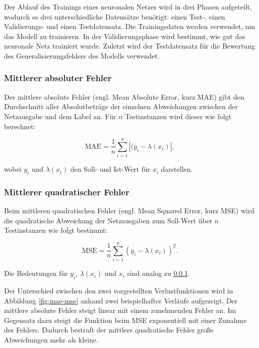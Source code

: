 \mypar Der Ablauf des Trainings eines neuronalen Netzes wird in drei Phasen aufgeteilt, wodurch es drei unterschiedliche Datensätze benötigt: einen Test-, einen Validierungs- und einen Testdatensatz. Die Trainingsdaten werden verwendet, um das Modell zu trainieren. In der Validierungsphase wird bestimmt, wie gut das neuronale Netz trainiert wurde. Zuletzt wird der Testdatensatz für die Bewertung des Generalisierungsfehlers des Modells verwendet. \cite{hastie2009elements}


\subsubsection{Mittlerer absoluter Fehler}\label{mae-section}
Der mittlere absolute Fehler (engl. Mean Absolute Error, kurz MAE) gibt den Durchschnitt aller Absolutbeträge der einzelnen Abweichungen zwischen der Netzausgabe und dem Label an. Für $n$ Testinstanzen wird dieser wie folgt berechnet:

\begin{equation}\label{eq:mae}
\text{MAE}=\frac{1}{n} \sum_{i=1}^{n} |(y_i - \lambda(x_i)|,
\end{equation}

\mypar wobei $y_i$ und $\lambda(x_i)$ den Soll- und Ist-Wert für $x_i$ darstellen. \cite{sammut2011encyclopedia}


\subsubsection{Mittlerer quadratischer Fehler}
Beim mittleren quadratischen Fehler (engl. Mean Squared Error, kurz MSE) wird die quadratische Abweichung der Netzausgaben zum Soll-Wert über $n$ Testinstanzen wie folgt bestimmt: 

\begin{equation}\label{eq:mse}
\text{MSE}=\frac{1}{n} \sum_{i=1}^{n}(y_i-\lambda(x_i))^2.
\end{equation}

Die Bedeutungen für $y_i$, $\lambda(x_i)$ und $x_i$ sind analog zu \ref{mae-section}. \cite{sammut2011encyclopedia}

\mypar Der Unterschied zwischen den zwei vorgestellten Verlustfunktionen wird in Abbildung \ref{fig:mae-mse} anhand zwei beispielhafter Verläufe aufgezeigt. Der mittlere absolute Fehler steigt linear mit einem zunehmenden Fehler an. Im Gegensatz dazu steigt die Funktion beim MSE exponentiell mit einer Zunahme des Fehlers. Dadurch bestraft der mittlere quadratische Fehler große Abweichungen mehr als kleine.

